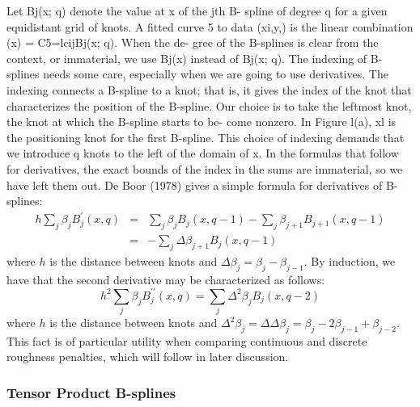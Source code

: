 \documentclass[12pt]{article}
\newcommand*\outlineskeleton{\color{green}}
\begin{document}
Let Bj(x; q) denote the value at x of the jth B- spline of degree q for a given equidistant grid of knots. A fitted curve 5 to data (xi,y,) is the linear combination (x) = C5=lcijBj(x; q). When the de- gree of the B-splines is clear from the context, or immaterial, we use Bj(x) instead of Bj(x; q).
The indexing of B-splines needs some care, especially when we are going to use derivatives. The indexing connects a B-spline to a knot; that is, it gives the index of the knot that characterizes the position of the B-spline. Our choice is to take the leftmost knot, the knot at which the B-spline starts to be- come nonzero. In Figure l(a), xl is the positioning knot for the first B-spline. This choice of indexing demands that we introduce q knots to the left of the domain of x. In the formulas that follow for derivatives, the exact bounds of the index in the sums are immaterial, so we have left them out.
De Boor (1978) gives a simple formula for derivatives of B-splines:
\begin{eqnarray}
h\sum_{j} \beta_j B_j^\prime \left(x,q\right) &=& \sum_{j} \beta_j B_j\left(x,q-1\right)-\sum_{j} \beta_{j+1} B_{j+1} \left(x,q-1\right) \nonumber \\ 
&=& -\sum_{j} \Delta\beta_{j+1} B_{j} \left(x,q-1\right) \label{bspline_deriv}
\end{eqnarray}
\noindent
where $h$ is the distance between knots and $\Delta \beta_j = \beta_j-\beta_{j-1}$. By induction, we have that the second derivative may be characterized as follows:
\begin{equation}
h^2\sum_{j} \beta_j B_j^{\prime \prime} \left(x,q\right) = \sum_{j} \Delta^2 \beta_{j} B_{j} \left(x,q-2\right) \label{bspline_2nd_deriv}
\end{equation}
\noindent
where $h$ is the distance between knots and $\Delta^2 \beta_j = \Delta\Delta \beta_j = \beta_j - 2\beta_{j-1}+\beta_{j-2} $. This fact is of particular utility when comparing continuous and discrete roughness penalties, which will follow in later discussion.

\subsubsection{{\outlineskeleton Tensor Product B-splines}}
\end{document}
